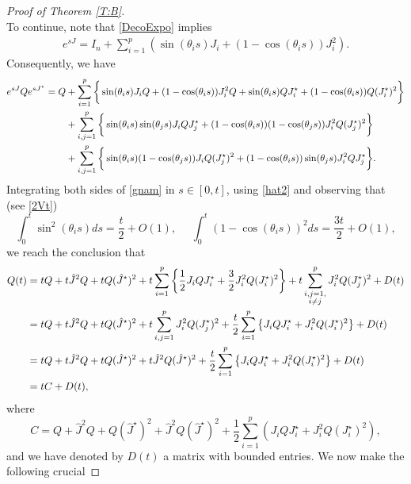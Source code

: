 \documentclass[11pt,letter]{amsart}
\numberwithin{equation}{section}
\numberwithin{equation}{section}
\begin{document}
\begin{proof}[Proof of Theorem \ref{T:B}]
\begin{equation}
\end{equation}
To continue, note that \eqref{DecoExpo} implies
\begin{align*}
e^{sJ}=I_{n}+\sum_{i=1}^{p}(\sin (\theta_{i}s)J_{i}+(1-\cos(\theta_{i}s))J_{i}^{2}).
\end{align*}
Consequently, we have
\begin{align}\label{gnam}
 e^{sJ}Qe^{sJ^{\star}}  = Q &+  \sum_{i=1}^{p}\bigg\{\sin(\theta_{i}s)J_{i}Q+(1-\cos(\theta_{i}s))J_{i}^{2}Q + \sin(\theta_{i}s)QJ_{i}^{\star}+(1-\cos(\theta_{i}s))Q(J_{i}^{\star})^{2}\bigg\}
\\
&+\sum_{i,j=1}^{p}\bigg\{\sin(\theta_{i}s)\sin(\theta_{j}s)J_{i}QJ_{j}^{\star}+(1-\cos(\theta_{i}s))(1-\cos(\theta_{j}s))J_{i}^{2}Q(J_{j}^{\star})^{2}\bigg\}
\notag\\
&+\sum_{i,j=1}^{p}\bigg\{\sin(\theta_{i}s)(1-\cos(\theta_{j}s))J_{i}Q(J_{j}^{\star})^{2}+(1-\cos(\theta_{i}s))\sin(\theta_{j}s)J_{i}^{2}QJ_{j}^{\star}\bigg\}.
\notag
\end{align}
Integrating both sides of \eqref{gnam} in $s\in [0,t]$, using \eqref{hat2} and observing that (see \eqref {2Vt}) 
\[
\int_{0}^{t}\sin^{2}(\theta_{i}s)ds=\frac{t}{2} +O(1),\ \ \ \ \ \ \int_{0}^{t}(1-\cos(\theta_{i}s))^{2}ds=\frac{3t}{2}+O(1),
\]
we reach the conclusion that 
\begin{align}\label{QQt}
Q(t)& = tQ+t\hat{J}^{2}Q+tQ(\hat{J}^{\star})^{2}+t\sum_{i=1}^{p}\left\{\frac{1}{2} J_{i} Q J_{i}^{\star}+ \frac{3}{2}J_{i}^{2}Q (J_{i}^{\star})^{2}\right\}+t\sum_{\substack{i,j=1,\\i\neq j}}^{p}J_{i}^{2}Q(J_{j}^{\star})^{2}+D(t)
\\
& = tQ+t\hat{J}^{2}Q+tQ(\hat{J}^{\star})^{2}+t \sum_{i,j=1}^{p}J_{i}^{2}Q(J_{j}^{\star})^{2}+\frac{t}{2}\sum_{i=1}^{p}\left\{J_{i} Q J_{i}^{\star}+ J_{i}^{2}Q (J_{i}^{\star})^{2}\right\}+D(t)
\notag\\
& = tQ+t\hat{J}^{2}Q+tQ(\hat{J}^{\star})^{2}+t\hat{J}^{2}Q(\hat{J}^{\star})^{2}+\frac{t}{2}\sum_{i=1}^{p}\left\{J_{i} Q J_{i}^{\star}+ J_{i}^{2}Q (J_{i}^{\star})^{2}\right\}+D(t)
\notag\\
& = t C  + D(t), 
\notag
\end{align}
where
\begin{equation}\label{CC}
C = Q+\hat{J}^{2}Q+Q(\hat{J}^{\star})^{2}+\hat{J}^{2}Q(\hat{J}^{\star})^{2}+\frac{1}{2}\sum_{i=1}^{p}(J_{i} Q J_{i}^{\star}+ J_{i}^{2}Q (J_{i}^{\star})^{2}),
\end{equation}
and we have denoted by $D(t)$ a matrix with bounded entries. We now make the following crucial


\end{proof}
\end{document}
